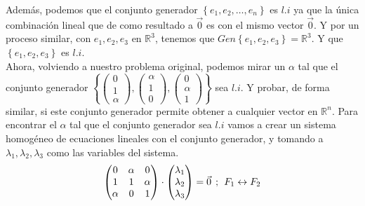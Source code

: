 \documentclass{article}
\begin{document}
\begin{enumerate}
        Además, podemos que el conjunto generador \(\left\{e_1, e_2, \ldots, e_n\right\}\) es \(l.i\) 
        ya que la única combinación lineal que de como resultado a \(\vec{0}\) es con el mismo vector \(\vec{0}\).
        Y por un proceso similar, con \(e_1, e_2, e_3\) en \(\mathbb{R}^3\), tenemos que \(Gen\left\{e_1, e_2, e_3\right\} = \mathbb{R}^3\). Y que \(\left\{e_1, e_2, e_3\right\}\) es \(l.i\).
        \\
        Ahora, volviendo a nuestro problema original, podemos mirar un \(\alpha\) tal que el conjunto generador 
        \(
        \left\{
            \begin{pmatrix}
                0 \\ 1 \\ \alpha
            \end{pmatrix},
            \begin{pmatrix}
                \alpha \\ 1 \\ 0
            \end{pmatrix},
            \begin{pmatrix}
                0 \\ \alpha \\ 1
            \end{pmatrix}
        \right\}
        \)
        sea \(l.i\). Y probar, de forma similar, si este conjunto generador permite obtener a cualquier vector en \(\mathbb{R}^n\).
        Para encontrar el \(\alpha\) tal que el conjunto generador sea \(l.i\) vamos a crear un sistema homogéneo de ecuaciones lineales con el conjunto generador, 
        y tomando a \(\lambda_1, \lambda_2, \lambda_3\) como las variables del sistema.
        \[
            \begin{pmatrix}
                0 & \alpha & 0 \\
                1 & 1 & \alpha \\
                \alpha & 0 & 1
            \end{pmatrix}
            \cdot
            \begin{pmatrix}
                \lambda_1 \\ \lambda_2 \\ \lambda_3
            \end{pmatrix}
            =
            \vec{0}
            \hspace{1ex};\hspace{1ex}
            \begin{aligned}
                F_1 \leftrightarrow F_2

\end{aligned}\]
\end{enumerate}
\end{document}

